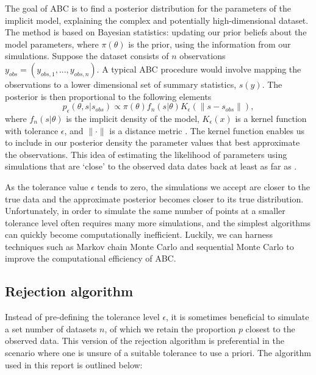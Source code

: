 \documentclass[]{article}
\begin{document}
	The goal of ABC is to find a posterior distribution for the parameters of the implicit model, explaining the complex and potentially high-dimensional dataset. The method is based on Bayesian statistics: updating our prior beliefs about the model parameters, where $\pi(\theta)$ is the prior, using the information from our simulations. Suppose the dataset consists of $n$ observations $y_{obs} = (y_{obs,1}, ..., y_{obs,n})$. A typical ABC procedure would involve mapping the observations to a lower dimensional set of summary statistics, $s(y)$. The posterior is then proportional to the following elements
	\begin{equation}
	p_{\epsilon}(\theta, s|s_{obs}) \propto \pi(\theta)f_n(s|\theta)K_{\epsilon}(\|s - s_{obs}\|),
	\end{equation}
	where $f_n(s|\theta)$ is the implicit density of the model, $K_{\epsilon}(x)$ is a kernel function with tolerance $\epsilon$, and $\| \cdot \|$ is a distance metric \citep{RN2}. The kernel function enables us to include in our posterior density the parameter values that best approximate the observations. This idea of estimating the likelihood of parameters using simulations that are `close' to the observed data dates back at least as far as \cite{RN56}.
	
	As the tolerance value $\epsilon$ tends to zero, the simulations we accept are closer to the true data and the approximate posterior becomes closer to its true distribution. Unfortunately, in order to simulate the same number of points at a smaller tolerance level often requires many more simulations, and the simplest algorithms can quickly become computationally inefficient. Luckily, we can harness techniques such as Markov chain Monte Carlo \citep{RN17, RN27} and sequential Monte Carlo \citep{RN21, RN30, RN22, RN29} to improve the computational efficiency of ABC.
	
	\subsection{Rejection algorithm}
	\label{sec1}
	
	Instead of pre-defining the tolerance level $\epsilon$, it is sometimes beneficial to simulate a set number of datasets $n$, of which we retain the proportion $p$ closest to the observed data. This version of the rejection algorithm is preferential in the scenario where one is unsure of a suitable tolerance to use a priori. The algorithm used in this report is outlined below:
	
\end{document}
